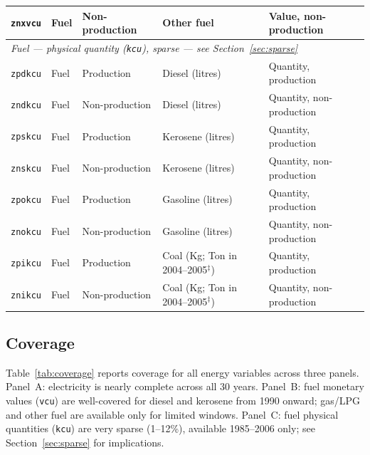 \documentclass[11pt, a4paper]{article}
\begin{document}
\begin{table}[H]
\begin{tabular}{lllp{3.2cm}p{5.5cm}}
\texttt{znxvcu} & Fuel & Non-production & Other fuel         & Value, non-production \\
\midrule
\multicolumn{5}{l}{\textit{Fuel --- physical quantity (\texttt{kcu}), sparse --- see Section~\ref{sec:sparse}}} \\
\texttt{zpdkcu} & Fuel & Production     & Diesel (litres)    & Quantity, production \\
\texttt{zndkcu} & Fuel & Non-production & Diesel (litres)    & Quantity, non-production \\
\texttt{zpskcu} & Fuel & Production     & Kerosene (litres)  & Quantity, production \\
\texttt{znskcu} & Fuel & Non-production & Kerosene (litres)  & Quantity, non-production \\
\texttt{zpokcu} & Fuel & Production     & Gasoline (litres)  & Quantity, production \\
\texttt{znokcu} & Fuel & Non-production & Gasoline (litres)  & Quantity, non-production \\
\texttt{zpikcu} & Fuel & Production     & Coal (Kg; Ton in 2004--2005$^\ddagger$) & Quantity, production \\
\texttt{znikcu} & Fuel & Non-production & Coal (Kg; Ton in 2004--2005$^\ddagger$) & Quantity, non-production \\
\bottomrule
\end{tabular}
\end{table}


\subsection{Coverage}

Table~\ref{tab:coverage} reports coverage for all energy variables across three panels.
Panel~A: electricity is nearly complete across all 30 years.
Panel~B: fuel monetary values (\texttt{vcu}) are well-covered for diesel and kerosene
from 1990 onward; gas/LPG and other fuel are available only for limited windows.
Panel~C: fuel physical quantities (\texttt{kcu}) are very sparse (1--12\%),
available 1985--2006 only; see Section~\ref{sec:sparse} for implications.
\end{document}
